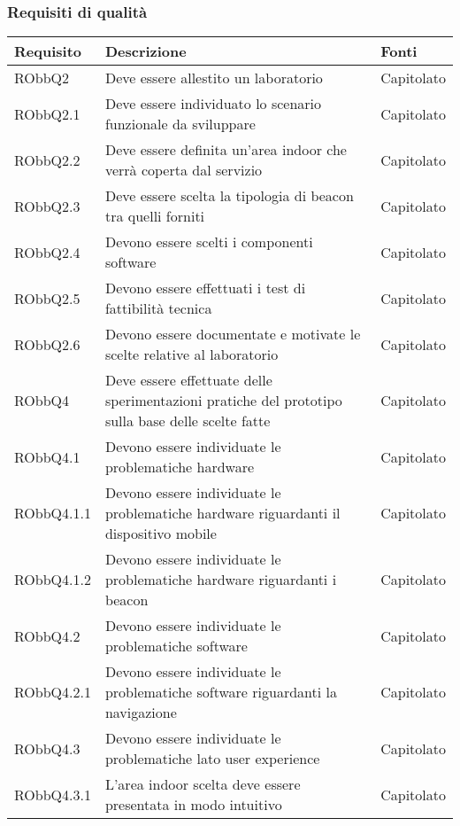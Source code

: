 \documentclass[../AnalisiDeiRequisiti.tex]{subfiles}
\begin{document}
\subsubsection{Requisiti di qualità}
\begin{longtabu} to \textwidth {X X[2] X}
	\toprule
	\textbf{Requisito} & \textbf{Descrizione} & \textbf{Fonti}\\
	\midrule
	\endhead
	RObbQ2 & Deve essere allestito un laboratorio & Capitolato \\ 
	\midrule 
	RObbQ2.1 & Deve essere individuato lo scenario funzionale da sviluppare & Capitolato \\ 
	\midrule 
	RObbQ2.2 & Deve essere definita un'area indoor che verrà coperta dal servizio & Capitolato \\ 
	\midrule 
	RObbQ2.3 & Deve essere scelta la tipologia di beacon tra quelli forniti & Capitolato \\ 
	\midrule 
	RObbQ2.4 & Devono essere scelti i componenti software & Capitolato \\ 
	\midrule 
	RObbQ2.5 & Devono essere effettuati i test di fattibilità tecnica & Capitolato \\ 
	\midrule 
	RObbQ2.6 & Devono essere documentate e motivate le scelte relative al laboratorio & Capitolato \\ 
	\midrule 
	RObbQ4 & Deve essere effettuate delle sperimentazioni pratiche del prototipo sulla base delle scelte fatte & Capitolato \\ 
	\midrule 
	RObbQ4.1 & Devono essere individuate le problematiche hardware & Capitolato \\ 
	\midrule 
	RObbQ4.1.1 & Devono essere individuate le problematiche hardware riguardanti il dispositivo mobile & Capitolato \\ 
	\midrule 
	RObbQ4.1.2 & Devono essere individuate le problematiche hardware riguardanti i beacon & Capitolato \\ 
	\midrule 
	RObbQ4.2 & Devono essere individuate le problematiche software & Capitolato \\ 
	\midrule 
	RObbQ4.2.1 & Devono essere individuate le problematiche software riguardanti la navigazione & Capitolato \\ 
	\midrule 
	RObbQ4.3 & Devono essere individuate le problematiche lato user experience & Capitolato \\ 
	\midrule 
	RObbQ4.3.1 & L'area indoor scelta deve essere presentata in modo intuitivo  & Capitolato \\ 
	\midrule 

\end{longtabu}
\end{document}
